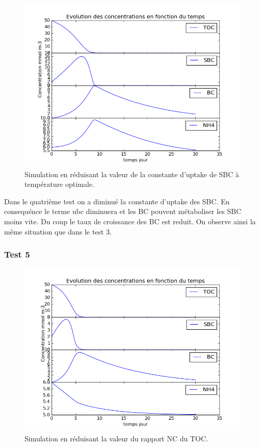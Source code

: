 \begin{figure}[h!]
  \includegraphics[width=\textwidth]{partie1/Test4.png}
  \caption{Simulation en r\'eduisant la valeur de la constante d'uptake de SBC \`a temp\'erature optimale.}
  \label{fig:partie1test4}
\end{figure}

\par{
Dans le quatrième test on a diminué la constante d'uptake des SBC. En consequénce le terme ubc diminuera et
les BC pouvent métaboliser les SBC moins vite. Du coup le taux de croissance des BC est reduit. On observe
ainsi la même situation que dans le test 3.
}

\FloatBarrier
\newpage
\subsubsection{Test 5}

\begin{figure}[h!]
  \includegraphics[width=\textwidth]{partie1/Test5.png}
  \caption{Simulation en r\'eduisant la valeur du rapport NC du TOC.}
  \label{fig:partie1test5}
\end{figure}

